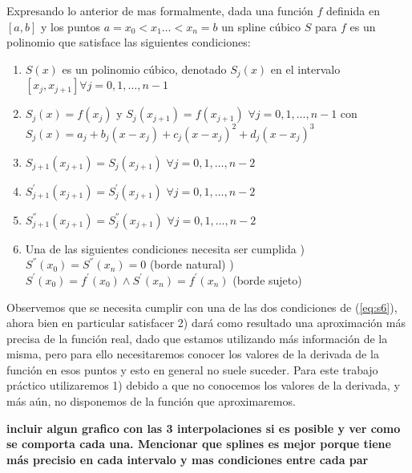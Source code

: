 
Expresando lo anterior de mas formalmente, dada una función $f$ definida en $[a, b]$ y los puntos $a = x_0 < x_1 \dots < x_n = b$ un spline cúbico $S$ para $f$ es un polinomio que satisface las siguientes condiciones:

\begin{enumerate}
\item $S(x)$ es un polinomio cúbico, denotado $S_j(x)$ en el intervalo $[x_j, x_{j+1}] \forall j = 0, 1, \dots, n-1$ \label{eq:s1}
\item $S_j(x) = f(x_j)$ y $S_j(x_{j+1}) = f(x_{j+1})$ $\forall j = 0, 1, \dots, n-1$ con $S_j(x) = a_j + b_j(x - x_j) + c_j(x - x_j)^2 + d_j(x - x_j)^3$ \label{eq:s2}
\item $S_{j+1}(x_{j+1}) = S_j(x_{j+1})$ $\forall j = 0, 1, \dots, n-2$ \label{eq:s3}
\item $S_{j+1}^{'}(x_{j+1}) = S_j^{'}(x_{j+1})$ $\forall j = 0, 1, \dots, n-2$ \label{eq:s4}
\item $S_{j+1}^{''}(x_{j+1}) = S_j^{''}(x_{j+1})$ $\forall j = 0, 1, \dots, n-2$ \label{eq:s5}
\item Una de las siguientes condiciones necesita ser cumplida \label{eq:s6}
) $S^{''}(x_0) = S^{''}(x_n) = 0$ (borde natural) 
) $S^{'}(x_0) =  f^{'}(x_0) \wedge S^{'}(x_n) = f^{'}(x_n)$ (borde sujeto) 
\end{enumerate}

Observemos que se necesita cumplir con una de las dos condiciones de (\ref{eq:s6}), ahora bien en particular satisfacer 2) dará como resultado una aproximación más precisa de la función real, dado que estamos utilizando más información de la misma, pero para ello necesitaremos conocer los valores de la derivada de la función en esos puntos y esto en general no suele suceder. Para este trabajo práctico utilizaremos 1) debido a que no conocemos los valores de la derivada, y más aún, no disponemos de la función que aproximaremos.

\textbf{incluir algun grafico con las 3 interpolaciones si es posible y ver como se comporta cada una. Mencionar que splines es mejor porque tiene más precisio en cada intervalo y mas condiciones entre cada par}

